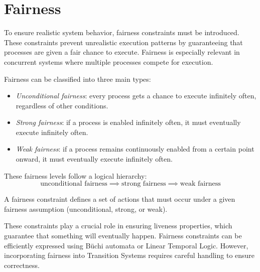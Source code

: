 \section{Fairness}

To ensure realistic system behavior, fairness constraints must be introduced. 
These constraints prevent unrealistic execution patterns by guaranteeing that processes are given a fair chance to execute. 
Fairness is especially relevant in concurrent systems where multiple processes compete for execution.

Fairness can be classified into three main types:
\begin{itemize}
    \item \textit{Unconditional fairness}: every process gets a chance to execute infinitely often, regardless of other conditions.
    \item \textit{Strong fairness}: if a process is enabled infinitely often, it must eventually execute infinitely often.
    \item \textit{Weak fairness}: if a process remains continuously enabled from a certain point onward, it must eventually execute infinitely often.
\end{itemize}
\noindent These fairness levels follow a logical hierarchy:
\[\text{unconditional fairness}\implies\text{strong fairness}\implies\text{weak fairness}\]

\begin{definition}
    A fairness constraint defines a set of actions that must occur under a given fairness assumption (unconditional, strong, or weak).
\end{definition}
\noindent These constraints play a crucial role in ensuring liveness properties, which guarantee that something will eventually happen.
Fairness constraints can be efficiently expressed using Büchi automata or Linear Temporal Logic. 
However, incorporating fairness into Transition Systems requires careful handling to ensure correctness.

